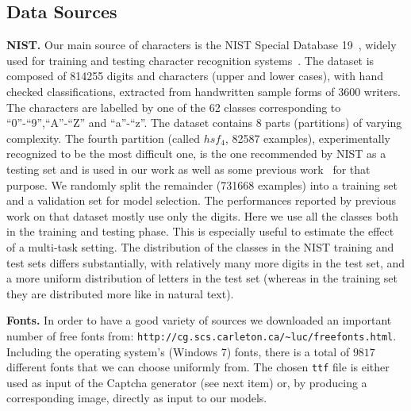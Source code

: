 \documentclass{article} %
\begin{document}
\subsection{Data Sources}
\vspace*{-2mm}

{\bf NIST.}
Our main source of characters is the NIST Special Database 19~\citep{Grother-1995}, 
widely used for training and testing character
recognition systems~\citep{Granger+al-2007,Cortes+al-2000,Oliveira+al-2002-short,Milgram+al-2005}. 
The dataset is composed of 814255 digits and characters (upper and lower cases), with hand checked classifications,
extracted from handwritten sample forms of 3600 writers. The characters are labelled by one of the 62 classes 
corresponding to ``0''-``9'',``A''-``Z'' and ``a''-``z''. The dataset contains 8 parts (partitions) of varying complexity. 
The fourth partition (called $hsf_4$, 82587 examples), 
experimentally recognized to be the most difficult one, is the one recommended 
by NIST as a testing set and is used in our work as well as some previous work~\citep{Granger+al-2007,Cortes+al-2000,Oliveira+al-2002-short,Milgram+al-2005}
for that purpose. We randomly split the remainder (731668 examples) into a training set and a validation set for
model selection. 
The performances reported by previous work on that dataset mostly use only the digits.
Here we use all the classes both in the training and testing phase. This is especially
useful to estimate the effect of a multi-task setting.
The distribution of the classes in the NIST training and test sets differs
substantially, with relatively many more digits in the test set, and a more uniform distribution
of letters in the test set (whereas in the training set they are distributed
more like in natural text).
\vspace*{-1mm}

{\bf Fonts.} 
In order to have a good variety of sources we downloaded an important number of free fonts from:
{\tt http://cg.scs.carleton.ca/\textasciitilde luc/freefonts.html}.
Including the operating system's (Windows 7) fonts, there is a total of $9817$ different fonts that we can choose uniformly from.
The chosen {\tt ttf} file is either used as input of the Captcha generator (see next item) or, by producing a corresponding image, 
directly as input to our models.
\vspace*{-1mm}
\end{document}
